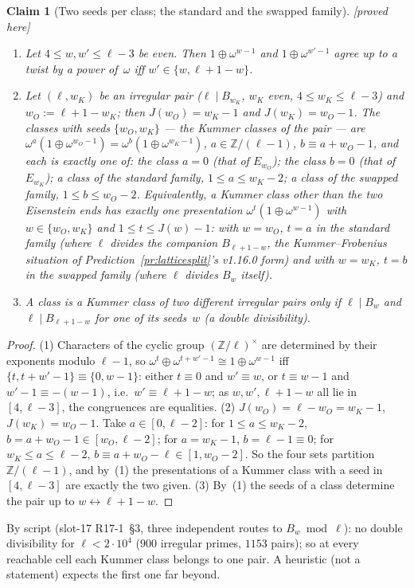 \documentclass[11pt]{article}
\newtheorem{claim}[theorem]{Claim}
\theoremstyle{remark}
\newcommand{\Z}{\mathbb{Z}}
\newcommand{\PROVED}{\textsf{[proved here]}}
\begin{document}
\begin{claim}[Two seeds per class; the standard and the swapped family]\label{cl:seedtwist}\PROVED\
\begin{enumerate}
\item Let $4\le w,w'\le\ell-3$ be even. Then $1\oplus\omega^{w-1}$ and $1\oplus\omega^{w'-1}$ agree up to a twist by a power of~$\omega$ iff $w'\in\{w,\ell+1-w\}$.
\item Let $(\ell,w_K)$ be an \emph{irregular pair} ($\ell\mid B_{w_K}$, $w_K$ even, $4\le w_K\le\ell-3$) and $w_O:=\ell+1-w_K$; then $J(w_O)=w_K-1$ and
  $J(w_K)=w_O-1$. The classes with seeds $\{w_O,w_K\}$ --- the \emph{Kummer classes} of the pair --- are $\omega^{a}(1\oplus\omega^{w_O-1})=\omega^{b}(1\oplus\omega^{w_K-1})$,
  $a\in\Z/(\ell-1)$, $b\equiv a+w_O-1$, and each is exactly one of: the class $a=0$ (that of $E_{w_O}$); the class $b=0$ (that of $E_{w_K}$); a class of the
  \emph{standard family}, $1\le a\le w_K-2$; a class of the \emph{swapped family}, $1\le b\le w_O-2$. Equivalently, a Kummer class other than the two Eisenstein
  ends has exactly one presentation $\omega^{t}(1\oplus\omega^{w-1})$ with $w\in\{w_O,w_K\}$ and $1\le t\le J(w)-1$: with $w=w_O$, $t=a$ in the standard family
  (where $\ell$ divides the companion $B_{\ell+1-w}$, the Kummer--Frobenius situation of Prediction~\ref{pr:latticesplit}'s v1.16.0 form) and with $w=w_K$,
  $t=b$ in the swapped family (where $\ell$ divides $B_w$ itself).
\item A class is a Kummer class of two different irregular pairs only if $\ell\mid B_w$ and $\ell\mid B_{\ell+1-w}$ for one of its seeds~$w$ (a \emph{double
  divisibility}).
\end{enumerate}
\end{claim}
\begin{proof}
(1) Characters of the cyclic group $(\Z/\ell)^{\times}$ are determined by their exponents modulo $\ell-1$, so $\omega^{t}\oplus\omega^{t+w'-1}\cong1\oplus\omega^{w-1}$
iff $\{t,t+w'-1\}\equiv\{0,w-1\}$: either $t\equiv0$ and $w'\equiv w$, or $t\equiv w-1$ and $w'-1\equiv-(w-1)$, i.e.\ $w'\equiv\ell+1-w$; as $w,w',\ell+1-w$ all lie
in $[4,\ell-3]$, the congruences are equalities. (2) $J(w_O)=\ell-w_O=w_K-1$, $J(w_K)=w_O-1$. Take $a\in[0,\ell-2]$: for $1\le a\le w_K-2$, $b=a+w_O-1\in[w_O,\ell-2]$;
for $a=w_K-1$, $b=\ell-1\equiv0$; for $w_K\le a\le\ell-2$, $b\equiv a+w_O-\ell\in[1,w_O-2]$. So the four sets partition $\Z/(\ell-1)$, and by~(1) the presentations
of a Kummer class with a seed in $[4,\ell-3]$ are exactly the two given. (3) By~(1) the seeds of a class determine the pair up to $w\leftrightarrow\ell+1-w$.
\end{proof}
\noindent By script (slot-17 R17-1~\S3, three independent routes to $B_w\bmod\ell$): no double divisibility for $\ell<2\cdot10^{4}$ ($900$ irregular primes,
$1153$ pairs); so at every reachable cell each Kummer class belongs to one pair. A heuristic (not a statement) expects the first one far beyond.
\end{document}
